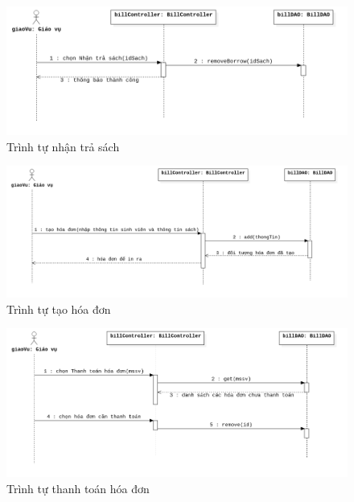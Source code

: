 \begin{figure}[H]
\centering
\includegraphics[width=\textwidth]{figures/nhantrasachseq.png}
\caption{Trình tự nhận trả sách}
\end{figure}

\begin{figure}[H]
\centering
\includegraphics[width=\textwidth]{figures/taohoadonseq.png}
\caption{Trình tự tạo hóa đơn}
\end{figure}

\begin{figure}[H]
\centering
\includegraphics[width=\textwidth]{figures/thanhtoanseq.png}
\caption{Trình tự thanh toán hóa đơn}
\end{figure}

